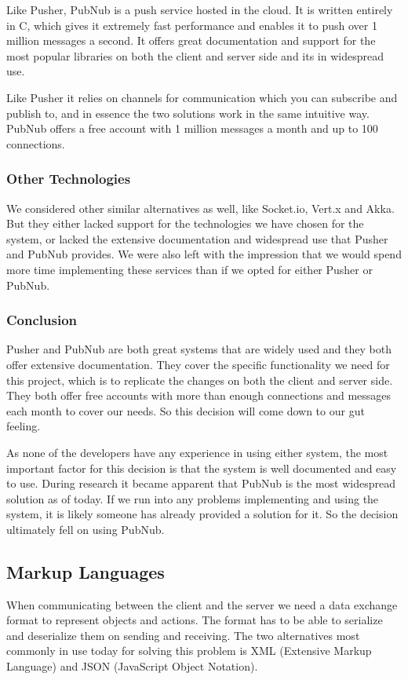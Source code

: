 Like Pusher, PubNub is a push service hosted in the cloud. It is written entirely in C, which gives it extremely fast performance and enables it to push over 1 million messages a second. It offers great documentation and support for the most popular libraries on both the client and server side and its in widespread use.

Like Pusher it relies on channels for communication which you can subscribe and publish to, and in essence the two solutions work in the same intuitive way. PubNub offers a free account with 1 million messages a month and up to 100 connections.

\subsubsection{Other Technologies}
We considered other similar alternatives as well, like Socket.io, Vert.x and Akka. But they either lacked support for the technologies we have chosen for the system, or lacked the extensive documentation and widespread use that Pusher and PubNub provides. We were also left with the impression that we would spend more time implementing these services than if we opted for either Pusher or PubNub.

\subsubsection{Conclusion}
Pusher and PubNub are both great systems that are widely used and they both offer extensive documentation. They cover the specific functionality we need for this project, which is to replicate the changes on both the client and server side. They both offer free accounts with more than enough connections and messages each month to cover our needs. So this decision will come down to our gut feeling. 

As none of the developers have any experience in using either system, the most important factor for this decision is that the system is well documented and easy to use. During research it became apparent that PubNub is the most widespread solution as of today. If we run into any problems implementing and using the system, it is likely someone has already provided a solution for it. So the decision ultimately fell on using PubNub.


\subsection{Markup Languages}
When communicating between the client and the server we need a data exchange format to represent objects and actions. The format has to be able to serialize and deserialize them on sending and receiving. The two alternatives most commonly in use today for solving this problem is XML (Extensive Markup Language) and JSON (JavaScript Object Notation).

